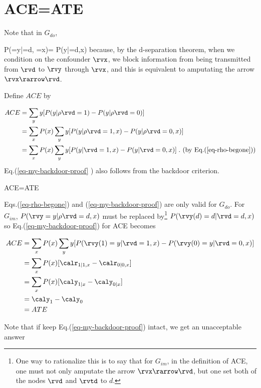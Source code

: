 \section{ACE=ATE}

Note that in $G_{do}$,

\beq
P(\rvy=y|\rho \rvd=d, \rvx=x)=
P(y|\rvd=d,x)
\;
\label{eq-rho-begone}
\eeq
because, by the d-separation
theorem,  when we condition on
the confounder $\rvx$,
we  block information from being
transmitted from $\rvd$ to $\rvy$ through $\rvx$,
and this is equivalent to
amputating the arrow $\rvx\rarrow\rvd$.

Define $ACE$ by

\begin{align}
ACE&=\sum_y y
[P(y|\rho\rvd=1)-P(y|\rho\rvd=0)]
\\
&=
\sum_x P(x)\sum_y y [P(y|\rho\rvd=1,x)-P(y|\rho\rvd=0,x)]
\\
&=
\sum_x P(x)\sum_y y [P(y|\rvd=1,x)-P(y|\rvd=0,x)]
\;. \text{ (by Eq.(\ref{eq-rho-begone}))}
\label{eq-my-backdoor-proof}
\end{align}
Eq.(\ref{eq-my-backdoor-proof} )
also follows from the backdoor criterion.


\begin{claim}\label{cl-ace-ate}
\beq
ACE=ATE
\eeq
\end{claim}
\proof

Eqs.(\ref{eq-rho-begone})
and (\ref{eq-my-backdoor-proof})
are only valid for $G_{do}$.
For $G_{im}$,
$P(\rvy=y|\rho \rvd=d, x)$
must be replaced by\footnote{
One way to rationalize this is to say
that for $G_{im}$,
in the definition of ACE,
one must not only amputate
the arrow $\rvx\rarrow \rvd$,
but
one
set both of the nodes $\rvd$ and $\rvtd$ to $d$.}
$P(\rvy(d)=d|\rvd=d,x)$
so Eq.(\ref{eq-my-backdoor-proof})
for ACE becomes


\begin{align}
ACE&=
\sum_x P(x)\sum_y y [P(\rvy(1)=y|\rvd=1,x)-
P(\rvy(0)=y|\rvd=0,x)]
\\
&=\sum_x P(x)[\calr_{1|1, x}-\calr_{0|0, x}]
\\
&=
\sum_x P(x)[\caly_{1|x}-\caly_{0|x}]
\\
&=
\caly_{1}-\caly_{0}
\\
&=
ATE
\end{align}

Note that if keep
Eq.(\ref{eq-my-backdoor-proof}) intact,
we get an unacceptable answer

